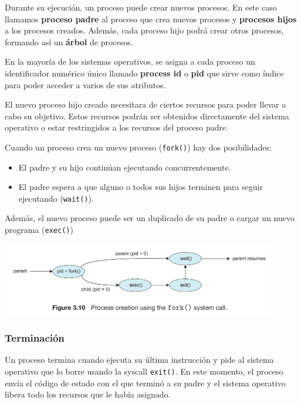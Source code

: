 Durante su ejecución, un proceso puede crear nuevos procesos. En este caso llamamos \textbf{proceso padre} al proceso que crea nuevos procesos y \textbf{procesos hijos} a los procesos creados. Además, cada proceso hijo podrá crear otros procesos, formando así un \textbf{árbol} de procesos.

En la mayoría de los sistemas operativos, se asigna a cada proceso un identificador numérico único llamado \textbf{process id} o \textbf{pid} que sirve como índice para poder acceder a varios de sus atributos.

El nuevo proceso hijo creado necesitara de ciertos recursos para poder llevar a cabo su objetivo. Estos recursos podrán ser obtenidos directamente del sistema operativo o estar restringidos a los recursos del proceso padre.

Cuando un proceso crea un nuevo proceso (\texttt{fork()}) hay dos posibilidades:

\begin{itemize}
	\item El padre y su hijo continúan ejecutando concurrentemente.
	\item El padre espera a que alguno o todos sus hijos terminen para seguir ejecutando (\texttt{wait()}).
\end{itemize}

Además, el nuevo proceso puede ser un duplicado de su padre o cargar un nuevo programa (\texttt{exec()})

\begin{center}
	\includegraphics[width=0.9\textwidth]{imagenes/process_creation.png}
	\end{center}

\subsubsection{Terminación}
Un proceso termina cuando ejecuta su última instrucción y pide al sistema operativo que lo borre usando la syscall \texttt{exit()}. En este momento, el proceso envía el código de estado con el que terminó a su padre y el sistema operativo libera todo los recursos que le había asignado.

